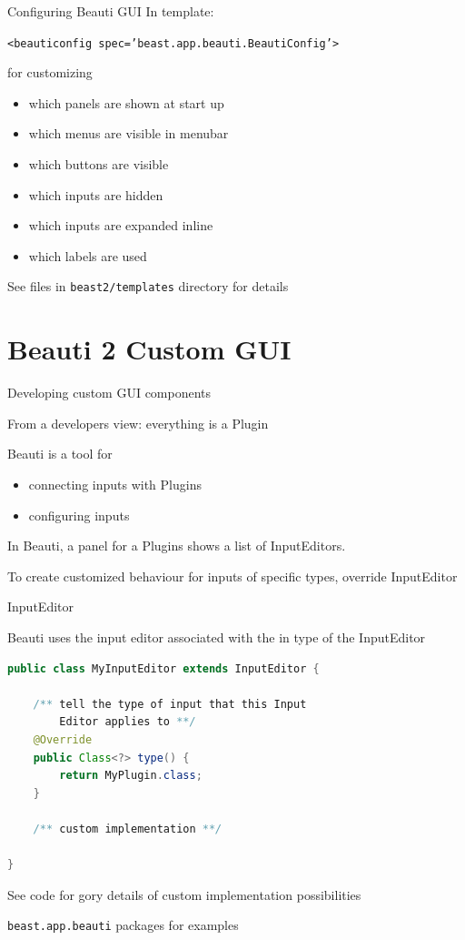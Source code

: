\documentclass{beamer}
\theoremstyle{definition}
\begin{document}
\begin{frame}[containsverbatim]{Configuring Beauti GUI}
In template:

{\tt <beauticonfig spec='beast.app.beauti.BeautiConfig'>} 

for customizing 
\begin{itemize}
\item which panels are shown at start up
\item which menus are visible in menubar
\item which buttons are visible
\item which inputs are hidden
\item which inputs are expanded inline
\item which labels are used
\end{itemize}

See files in {\tt beast2/templates} directory for details
\end{frame}

\section{Beauti 2 Custom GUI}

\begin{frame}[containsverbatim]{Developing custom GUI components}

From a developers view: everything is a Plugin\vskip0.5cm

Beauti is a tool for \\
\begin{itemize}
\item connecting inputs with Plugins\\
\item configuring inputs\vskip0.5cm
\end{itemize}

In Beauti, a panel for a Plugins shows a list of InputEditors.\vskip0.5cm

To create customized behaviour for inputs of specific types, 
override InputEditor
\end{frame}

\begin{frame}[containsverbatim]{InputEditor}


Beauti uses the input editor associated with the in type of the InputEditor\vskip0.5cm


\begin{lstlisting}[language=java]
public class MyInputEditor extends InputEditor {

    /** tell the type of input that this Input 
        Editor applies to **/
	@Override
    public Class<?> type() {
        return MyPlugin.class;
    }

    /** custom implementation **/

} 
\end{lstlisting}

See code for gory details of custom implementation possibilities\vskip0.5cm

{\tt beast.app.beauti} packages for examples

\end{frame}
\end{document}
